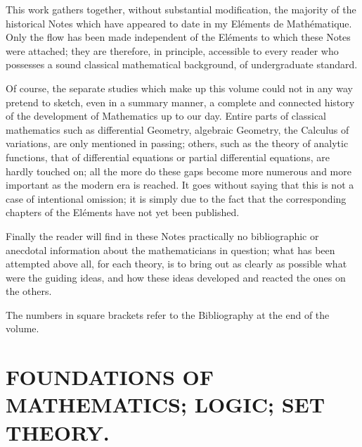 
This work gathers together, without substantial modification, the majority of the historical Notes which have appeared to date in my Eléments de Mathématique. Only the flow has been made independent of the Eléments to which these Notes were attached; they are therefore, in principle, accessible to every reader who possesses a sound classical mathematical background, of undergraduate standard.

Of course, the separate studies which make up this volume could not in any way pretend to sketch, even in a summary manner, a complete and connected history of the development of Mathematics up to our day. Entire parts of classical mathematics such as differential Geometry, algebraic Geometry, the Calculus of variations, are only mentioned in passing; others, such as the theory of analytic functions, that of differential equations or partial differential equations, are hardly touched on; all the more do these gaps become more numerous and more important as the modern era is reached. It goes without saying that this is not a case of intentional omission; it is simply due to the fact that the corresponding chapters of the Eléments have not yet been published.

Finally the reader will find in these Notes practically no bibliographic or anecdotal information about the mathematicians in question; what has been attempted above all, for each theory, is to bring out as clearly as possible what were the guiding ideas, and how these ideas developed and reacted the ones on the others.

The numbers in square brackets refer to the Bibliography at the end of the volume.

\tableofcontents
\mainmatter

\chapter{FOUNDATIONS OF MATHEMATICS; LOGIC; SET THEORY.}

